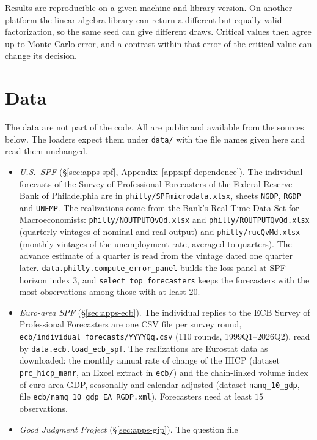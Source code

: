 \begin{appendix}
Results are reproducible on a given machine and library version. On another platform
the linear-algebra library can return a different but equally valid factorization, so
the same seed can give different draws. Critical values then agree up to Monte Carlo
error, and a contrast within that error of the critical value can change its decision.

\section{Data}
\label{app:impl-data}

The data are not part of the code. All are public and available from the sources
below. The loaders expect them under \texttt{data/} with the file names given here and
read them unchanged.
\begin{itemize}[leftmargin=*]
  \item \emph{U.S.\ SPF} (\S\ref{sec:apps-spf}, Appendix~\ref{app:spf-dependence}).
    The individual forecasts of the Survey of Professional Forecasters of the Federal
    Reserve Bank of Philadelphia \citep{croushore2019spf} are in
    \texttt{philly/SPFmicrodata.xlsx}, sheets \texttt{NGDP}, \texttt{RGDP} and
    \texttt{UNEMP}. The realizations come from the Bank's Real-Time Data Set for
    Macroeconomists: \texttt{philly/NOUTPUTQvQd.xlsx} and
    \texttt{philly/ROUTPUTQvQd.xlsx} (quarterly vintages of nominal and real output)
    and \texttt{philly/rucQvMd.xlsx} (monthly vintages of the unemployment rate,
    averaged to quarters). The advance estimate of a quarter is read from the vintage
    dated one quarter later. \texttt{data.philly.compute\_error\_panel} builds the
    loss panel at SPF horizon index $3$, and \texttt{select\_top\_forecasters} keeps
    the forecasters with the most observations among those with at least $20$.
  \item \emph{Euro-area SPF} (\S\ref{sec:apps-ecb}). The individual replies to the
    ECB Survey of Professional Forecasters are one CSV file per survey round,
    \texttt{ecb/individual\_forecasts/YYYYQq.csv} (110 rounds, 1999Q1--2026Q2), read
    by \texttt{data.ecb.load\_ecb\_spf}. The realizations are Eurostat data as
    downloaded: the monthly annual rate of change of the HICP (dataset
    \texttt{prc\_hicp\_manr}, an Excel extract in \texttt{ecb/}) and the chain-linked
    volume index of euro-area GDP, seasonally and calendar adjusted (dataset
    \texttt{namq\_10\_gdp}, file \texttt{ecb/namq\_10\_gdp\_EA\_RGDP.xml}). Forecasters
    need at least $15$ observations.
  \item \emph{Good Judgment Project} (\S\ref{sec:apps-gjp}). The question file

\end{itemize}
\end{appendix}
